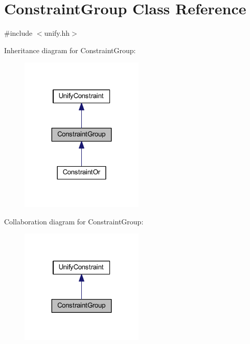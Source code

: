 \hypertarget{class_constraint_group}{}\section{Constraint\+Group Class Reference}
\label{class_constraint_group}


{\ttfamily \#include $<$unify.\+hh$>$}



Inheritance diagram for Constraint\+Group\+:
\nopagebreak
\begin{figure}[H]
\begin{center}
\leavevmode
\includegraphics[width=167pt]{class_constraint_group__inherit__graph}
\end{center}
\end{figure}


Collaboration diagram for Constraint\+Group\+:
\nopagebreak
\begin{figure}[H]
\begin{center}
\leavevmode
\includegraphics[width=167pt]{class_constraint_group__coll__graph}
\end{center}
\end{figure}
